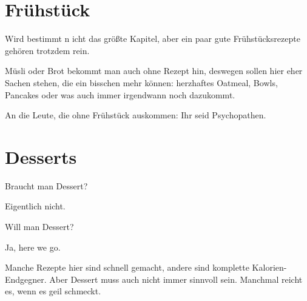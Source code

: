 \documentclass[
  a4paper,
  twoside,
  11pt
]{article}
\begin{document}
\section{Frühstück}

Wird bestimmt n
icht das größte Kapitel, aber ein paar gute Frühstücksrezepte gehören trotzdem rein.

Müsli oder Brot bekommt man auch ohne Rezept hin, deswegen sollen hier eher Sachen stehen, die ein bisschen mehr können: herzhaftes Oatmeal, Bowls, Pancakes oder was auch immer irgendwann noch dazukommt.

An die Leute, die ohne Frühstück auskommen: Ihr seid Psychopathen.

\mylocaltableofcontents%
\newpage






\section{Desserts}
Braucht man Dessert?

Eigentlich nicht.

Will man Dessert?

Ja, here we go.

Manche Rezepte hier sind schnell gemacht, andere sind komplette Kalorien-Endgegner. Aber Dessert muss auch nicht immer sinnvoll sein. Manchmal reicht es, wenn es geil schmeckt.

\mylocaltableofcontents%
\newpage















\end{document}

